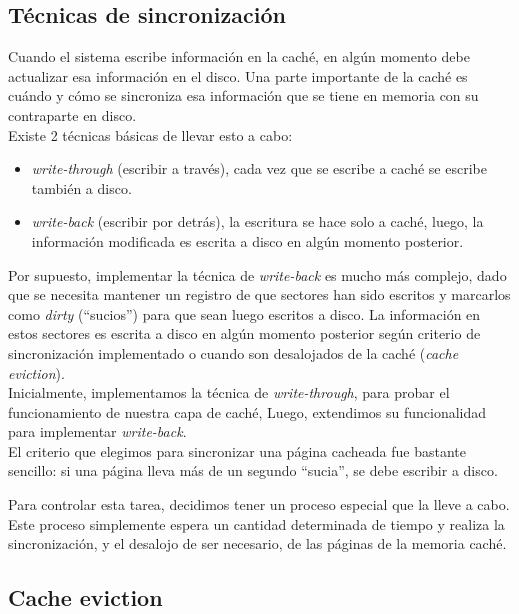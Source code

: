 \documentclass[a4paper,10pt]{article}
\begin{document}
        \subsection{Técnicas de sincronización}

        Cuando el sistema escribe información en la caché, en algún momento debe actualizar esa información en el disco. Una parte importante de la caché es cuándo y
        cómo se sincroniza esa información que se tiene en memoria con su contraparte en disco. \\

        Existe 2 técnicas básicas de llevar esto a cabo:

        \begin{itemize}
        \item \textit{write-through} (escribir a través), cada vez que se escribe a caché se escribe también a disco.
        \item \textit{write-back} (escribir por detrás), la escritura se hace solo a caché, luego, la información modificada es escrita a disco en algún momento posterior.
        \end{itemize}

        Por supuesto, implementar la técnica de \textit{write-back} es mucho más complejo, dado que se necesita mantener un registro de que sectores han sido escritos y 
        marcarlos como \textit{dirty} (``sucios'') para que sean luego escritos a disco. La información en estos sectores es escrita a disco en algún momento posterior
        según criterio de sincronización implementado o cuando son desalojados de la caché (\textit{cache eviction}). \\

        Inicialmente, implementamos la técnica de \textit{write-through},  para probar el funcionamiento de nuestra capa de caché, 
        Luego, extendimos su funcionalidad para implementar \textit{write-back}. \\

        El criterio que elegimos para sincronizar una página cacheada fue bastante sencillo: si una página lleva más de un segundo ``sucia'', se debe escribir a disco.
        
        Para controlar esta tarea, decidimos tener un proceso especial que la lleve a cabo. Este proceso simplemente espera un cantidad determinada de tiempo y realiza 
        la sincronización, y el desalojo de ser necesario, de las páginas de la memoria caché. 

        \subsection{Cache eviction}
        
\end{document}
